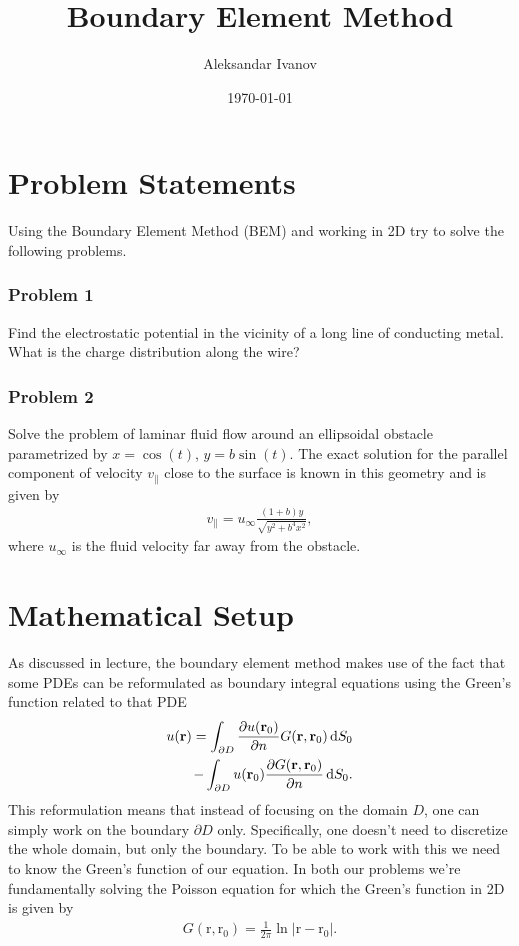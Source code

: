 \documentclass[10pt,a4paper,twocolumn]{article}
\renewcommand{\vec}[1]{\bm{\mathrm{#1}}}
\begin{document}
\title{Boundary Element Method}
\author{Aleksandar Ivanov}
\date{\today}
\maketitle

\section{Problem Statements}

Using the Boundary Element Method (BEM) and working in 2D try to solve the following problems.

\subsubsection*{Problem 1}

Find the electrostatic potential in the vicinity of a long line of conducting metal. What is the charge distribution along the wire?

\subsubsection*{Problem 2}

Solve the problem of laminar fluid flow around an ellipsoidal obstacle parametrized by $x = \cos(t)$, $y = b \sin(t)$. The exact solution for the parallel component of velocity $v_{\parallel}$ close to the surface is known in this geometry and is given by
%
\begin{align}
    v_{\parallel} = u_{\infty} \frac{(1 + b) y}{\sqrt{y^2 + b^4 x^2}},
\end{align}
%
where $u_{\infty}$ is the fluid velocity far away from the obstacle.


\section{Mathematical Setup}

As discussed in lecture, the boundary element method makes use of the fact that some PDEs can be reformulated as boundary integral equations using the Green's function related to that PDE
%
\begin{align}
    u(\vec{r}) = \int_{\partial D} \frac{\partial u(\vec{r}_0)}{\partial n} G(\vec{r}, \vec{r}_0) \dif S_0 \notag\\
    - \int_{\partial D} u(\vec{r}_0) \frac{\partial G(\vec{r}, \vec{r}_0)}{\partial n}  \dif S_0.
\end{align}
%
This reformulation means that instead of focusing on the domain $D$, one can simply work on the boundary $\partial D$ only. Specifically, one doesn't need to discretize the whole domain, but only the boundary. To be able to work with this we need to know the Green's function of our equation. In both our problems we're fundamentally solving the Poisson equation for which the Green's function in 2D is given by
%
\begin{align}
    G(\vec{r}, \vec{r}_0) = \frac{1}{2 \pi} \ln |\vec{r} - \vec{r}_0|.
\end{align}
\end{document}
